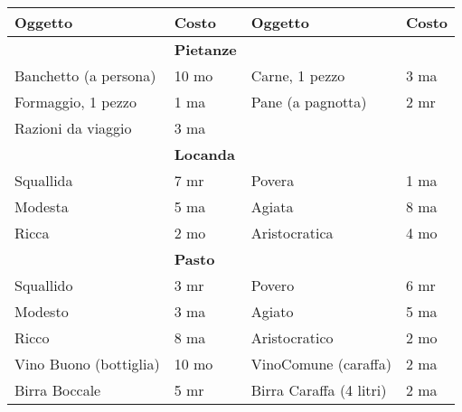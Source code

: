 \documentclass[landscape,10pt,a4paper]{article}
\begin{document}
\begin{multicols}{2}
\begin{dmbox}[title=Oggetti e Viveri - pagina \pageref{equipaggiamentolista}]
\noindent\begin{tabular}{ll|ll}
\textbf{Oggetto}&\textbf{Costo}&\textbf{Oggetto}&\textbf{Costo}\\
\hline
&\textbf{Pietanze} &&\\
Banchetto (a persona)&10 mo&Carne, 1 pezzo&3 ma\\
Formaggio, 1 pezzo&1 ma&Pane (a pagnotta)&2 mr\\
Razioni da viaggio& 3 ma &&\\
\hline
&\textbf{Locanda}&&\\
Squallida&7 mr&Povera&1 ma\\
Modesta&5 ma&Agiata&8 ma\\
Ricca&2 mo&Aristocratica&4 mo\\
\hline
&\textbf{Pasto}&&\\
Squallido&3 mr&Povero&6 mr\\
Modesto&3 ma&Agiato&5 ma\\
Ricco&8 ma&Aristocratico&2 mo\\
Vino Buono (bottiglia)&10 mo& VinoComune (caraffa)&2 ma\\
Birra Boccale&5 mr&Birra Caraffa (4 litri)&2 ma\\
\end{tabular}
\end{dmbox}






\pagebreak


\end{multicols}
\end{document}
